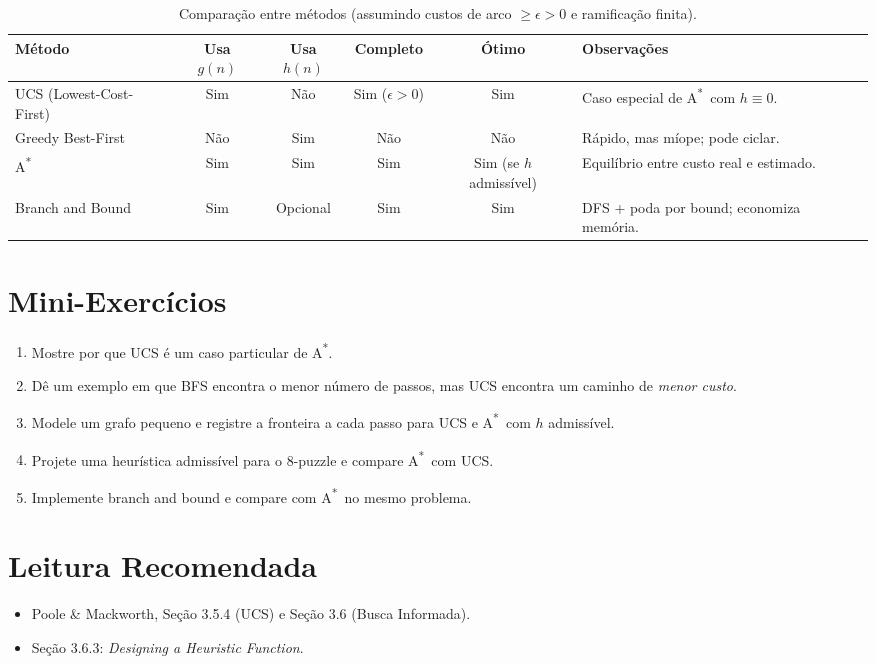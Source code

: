 \documentclass[9pt,a4paper]{extarticle}
\newcommand{\Astar}{A\textsuperscript{*}}
\begin{document}
\begin{table}[H]
\centering
\small
\setlength{\tabcolsep}{4pt}
\renewcommand{\arraystretch}{1.2}
\begin{tabular}{@{}lccccp{5.2cm}@{}}
\toprule
\textbf{Método} & \textbf{Usa $g(n)$} & \textbf{Usa $h(n)$} & \textbf{Completo} & \textbf{Ótimo} & \textbf{Observações} \\
\midrule
UCS (Lowest-Cost-First) & Sim & Não & Sim ($\epsilon>0$) & Sim & Caso especial de \Astar\ com $h\equiv 0$. \\
Greedy Best-First       & Não & Sim & Não               & Não & Rápido, mas míope; pode ciclar. \\
\Astar                  & Sim & Sim & Sim               & Sim (se $h$ admissível) & Equilíbrio entre custo real e estimado. \\
Branch and Bound        & Sim & Opcional & Sim         & Sim & DFS + poda por bound; economiza memória. \\
\bottomrule
\end{tabular}
\caption{Comparação entre métodos (assumindo custos de arco $\ge \epsilon>0$ e ramificação finita).}
\end{table}

\section*{Mini-Exercícios}

\begin{enumerate}
  \item Mostre por que UCS é um caso particular de \Astar.
  \item Dê um exemplo em que BFS encontra o menor número de passos, mas UCS encontra um caminho de \emph{menor custo}.
  \item Modele um grafo pequeno e registre a fronteira a cada passo para UCS e \Astar\ com $h$ admissível.
  \item Projete uma heurística admissível para o 8-puzzle e compare \Astar\ com UCS.
  \item Implemente branch and bound e compare com \Astar\ no mesmo problema.
\end{enumerate}

\section*{Leitura Recomendada}
\begin{itemize}
  \item Poole \& Mackworth, Seção 3.5.4 (UCS) e Seção 3.6 (Busca Informada).
  \item Seção 3.6.3: \textit{Designing a Heuristic Function}.
\end{itemize}
\end{document}
